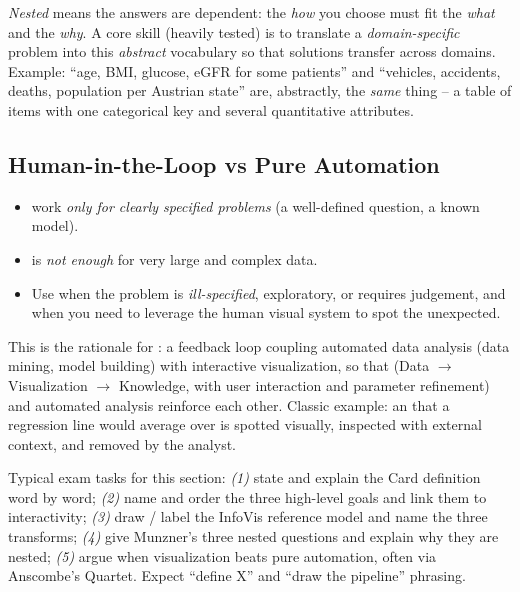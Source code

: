 \emph{Nested} means the answers are dependent: the \emph{how} you choose must fit the \emph{what} and the \emph{why}. A core skill (heavily tested) is to translate a \emph{domain-specific} problem into this \emph{abstract} vocabulary so that solutions transfer across domains. Example: ``age, BMI, glucose, eGFR for some patients'' and ``vehicles, accidents, deaths, population per Austrian state'' are, abstractly, the \emph{same} thing -- a table of items with one categorical key and several quantitative attributes.

\subsection{Human-in-the-Loop vs Pure Automation}

\begin{keybox}
\begin{itemize}
  \item {} work \emph{only for clearly specified problems} (a well-defined question, a known model).
  \item {} is \emph{not enough} for very large and complex data.
  \item Use  when the problem is \emph{ill-specified}, exploratory, or requires judgement, and when you need to leverage the human visual system to spot the unexpected.
\end{itemize}
\end{keybox}

This is the rationale for : a feedback loop coupling automated data analysis (data mining, model building) with interactive visualization, so that  (Data $\rightarrow$ Visualization $\rightarrow$ Knowledge, with user interaction and parameter refinement) and automated analysis reinforce each other. Classic example: an  that a regression line would average over is spotted visually, inspected with external context, and removed by the analyst.

\begin{exambox}
Typical exam tasks for this section: \emph{(1)} state and explain the Card definition word by word; \emph{(2)} name and order the three high-level goals and link them to interactivity; \emph{(3)} draw / label the InfoVis reference model and name the three transforms; \emph{(4)} give Munzner's three nested questions and explain why they are nested; \emph{(5)} argue when visualization beats pure automation, often via Anscombe's Quartet. Expect ``define X'' and ``draw the pipeline'' phrasing.
\end{exambox}

